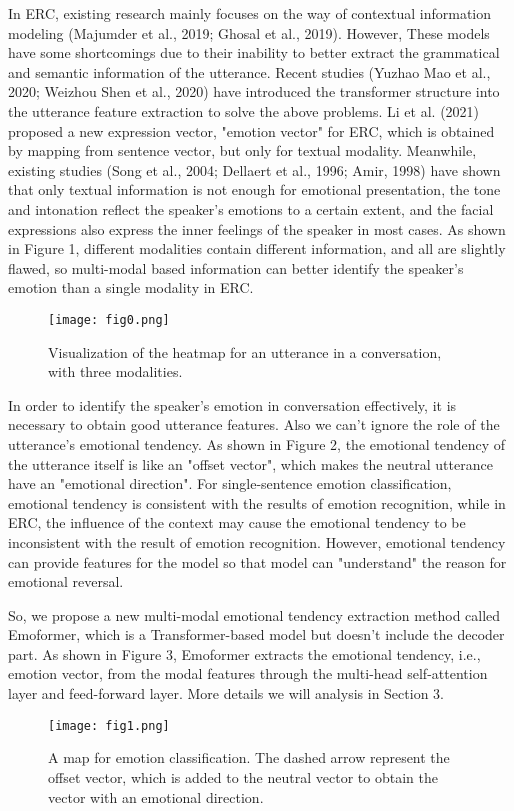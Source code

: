 In ERC, existing research mainly focuses on the way of contextual information modeling (Majumder et al., 2019; Ghosal et al., 2019). However, These models have some shortcomings due to their inability to better extract the grammatical and semantic information of the utterance. Recent studies (Yuzhao Mao et al., 2020; Weizhou Shen et al., 2020) have introduced the transformer structure into the utterance feature extraction to solve the above problems. Li et al. (2021) proposed a new expression vector, "emotion vector" for ERC, which is obtained by mapping from sentence vector, but only for textual modality. Meanwhile, existing studies (Song et al., 2004; Dellaert et al., 1996; Amir, 1998) have shown that only textual information is not enough for emotional presentation, the tone and intonation reflect the speaker’s emotions to a certain extent, and the facial expressions also express the inner feelings of the speaker in most cases. As shown in Figure 1, different modalities contain different information, and all are slightly flawed, so multi-modal based information can better identify the speaker's emotion than a single modality in ERC. 
\begin{figure}[t]
	\centering
	\texttt{[image: fig0.png]} 
	\caption{Visualization of the heatmap for an utterance in a conversation, with three modalities.}
	\label{fig0}
\end{figure}

In order to identify the speaker’s emotion in conversation effectively, it is necessary to obtain good utterance features. Also we can't ignore the role of the utterance’s emotional tendency. As shown in Figure 2, the emotional tendency of the utterance itself is like an "offset vector", which makes the neutral utterance have an "emotional direction". For single-sentence emotion classification, emotional tendency is consistent with the results of emotion recognition, while in ERC, the influence of the context may cause the emotional tendency to be inconsistent with the result of emotion recognition. However, emotional tendency can provide features for the model so that model can "understand" the reason for emotional reversal.

So, we propose a new multi-modal emotional tendency extraction method called Emoformer, which is a Transformer-based model but doesn't include the decoder part. As shown in Figure 3, Emoformer extracts the emotional tendency, i.e., emotion vector, from the modal features through the multi-head self-attention layer and feed-forward layer. More details we will analysis in Section 3.
\begin{figure}[t]
	\centering
	\texttt{[image: fig1.png]} 
	\caption{A map for emotion classification. The dashed arrow represent the offset vector, which is added to the neutral vector to obtain the vector with an emotional direction.}
	\label{fig1}
\end{figure}

